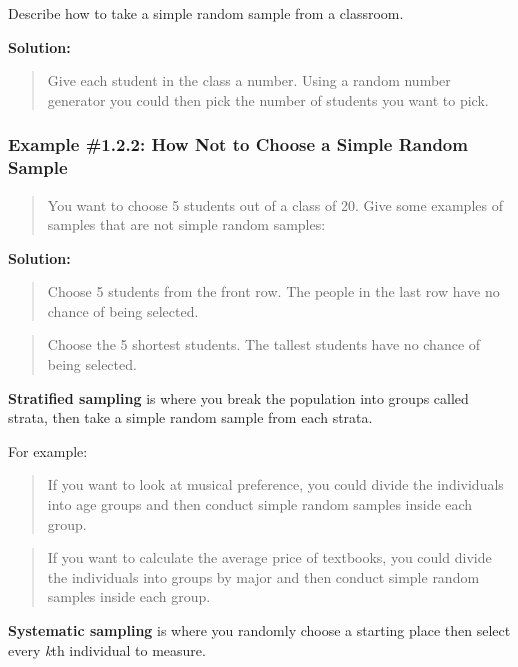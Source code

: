 \documentclass[]{book}
\begin{document}
Describe how to take a simple random sample from a classroom.

\textbf{Solution:}

\begin{quote}
Give each student in the class a number. Using a random number generator you could then pick the number of students you want to pick.
\end{quote}

\hypertarget{example-1.2.2-how-not-to-choose-a-simple-random-sample}{%
\subsubsection{Example \#1.2.2: How Not to Choose a Simple Random Sample}\label{example-1.2.2-how-not-to-choose-a-simple-random-sample}}

\begin{quote}
You want to choose 5 students out of a class of 20. Give some examples of samples that are {not} simple random samples:
\end{quote}

\textbf{Solution:}

\begin{quote}
Choose 5 students from the front row. The people in the last row have no chance of being selected.
\end{quote}

\begin{quote}
Choose the 5 shortest students. The tallest students have no chance of being selected.
\end{quote}

\textbf{Stratified sampling} is where you break the population into groups
called strata, then take a simple random sample from each strata.

For example:

\begin{quote}
If you want to look at musical preference, you could divide the individuals into age groups and then conduct simple random samples inside each group.
\end{quote}

\begin{quote}
If you want to calculate the average price of textbooks, you could divide the individuals into groups by major and then conduct simple random samples inside each group.
\end{quote}

\textbf{Systematic sampling} is where you randomly choose a starting place
then select every \emph{k}th individual to measure.
\end{document}
